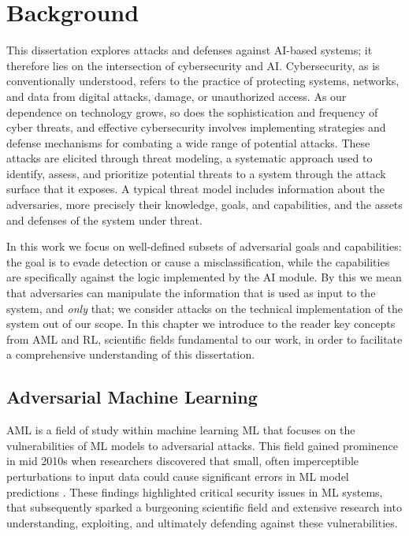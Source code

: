 \chapter{Background}\label{ch:background}

This dissertation explores attacks and defenses against AI-based systems; it therefore lies on the intersection of cybersecurity and AI.
Cybersecurity, as is conventionally understood, refers to the practice of protecting systems, networks, and data from digital attacks, damage, or unauthorized access.
As our dependence on technology grows, so does the sophistication and frequency of cyber threats, and effective cybersecurity involves implementing strategies and defense mechanisms for combating a wide range of potential attacks.
These attacks are elicited through threat modeling, a systematic approach used to identify, assess, and prioritize potential threats to a system through the attack surface that it exposes.
A typical threat model includes information about the adversaries, more precisely their knowledge, goals, and capabilities, and the assets and defenses of the system under threat.

In this work we focus on well-defined subsets of adversarial goals and capabilities: the goal is to evade detection or cause a misclassification, while the capabilities are specifically against the logic implemented by the AI module.
By this we mean that adversaries can manipulate the information that is used as input to the system, and \textit{only} that; we consider attacks on the technical implementation of the system out of our scope.
In this chapter we introduce to the reader key concepts from \gls{AML} and \gls{RL}, scientific fields fundamental to our work, in order to facilitate a comprehensive understanding of this dissertation.

\section{Adversarial Machine Learning}
\gls{AML} is a field of study within machine learning \gls{ML} that focuses on the vulnerabilities of \gls{ML} models to adversarial attacks.
This field gained prominence in mid 2010s when researchers discovered that small, often imperceptible perturbations to input data could cause significant errors in ML model predictions \cite{biggio2013evasion, szegedy2013intriguing}.
These findings highlighted critical security issues in ML systems, that subsequently sparked a burgeoning scientific field and extensive research into understanding, exploiting, and ultimately defending against these vulnerabilities.

